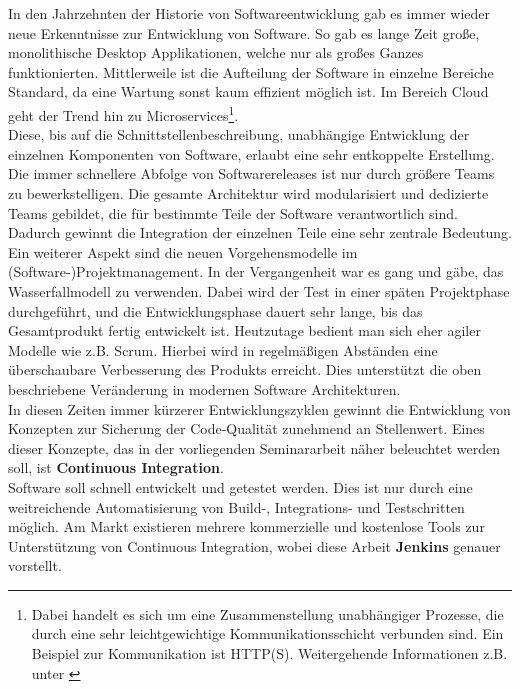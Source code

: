 In den Jahrzehnten der Historie von Softwareentwicklung gab es immer wieder neue Erkenntnisse zur Entwicklung von Software. So gab es lange Zeit große, monolithische Desktop Applikationen, welche nur als großes Ganzes funktionierten. Mittlerweile ist die Aufteilung der Software in einzelne Bereiche Standard, da eine Wartung sonst kaum effizient möglich ist. Im Bereich Cloud geht der Trend hin zu Microservices\footnote{Dabei handelt es sich um eine Zusammenstellung unabhängiger Prozesse, die durch eine sehr leichtgewichtige Kommunikationsschicht verbunden sind. Ein Beispiel zur Kommunikation ist HTTP(S). Weitergehende Informationen z.B. unter \cite{fowler-Microservice}}.\\
Diese, bis auf die Schnittstellenbeschreibung, unabhängige Entwicklung der einzelnen Komponenten von Software, erlaubt eine sehr entkoppelte Erstellung. Die immer schnellere Abfolge von Softwarereleases ist nur durch größere Teams zu bewerkstelligen. Die gesamte Architektur wird modularisiert und dedizierte Teams gebildet, die für bestimmte Teile der Software verantwortlich sind. Dadurch gewinnt die Integration der einzelnen Teile eine sehr zentrale Bedeutung.\\
Ein weiterer Aspekt sind die neuen Vorgehensmodelle im (Software-)Projektmanagement. In der Vergangenheit war es gang und gäbe, das Wasserfallmodell zu verwenden. Dabei wird der Test in einer späten Projektphase durchgeführt, und  die Entwicklungsphase dauert sehr lange, bis das Gesamtprodukt fertig entwickelt ist. Heutzutage bedient man sich eher agiler Modelle wie z.B. Scrum. Hierbei wird in regelmäßigen Abständen eine überschaubare Verbesserung des Produkts erreicht. Dies unterstützt die oben beschriebene Veränderung in modernen Software Architekturen. \\
In diesen Zeiten immer kürzerer Entwicklungszyklen gewinnt die Entwicklung von Konzepten zur Sicherung der Code-Qualität zunehmend an Stellenwert. Eines dieser Konzepte, das in der vorliegenden Seminararbeit näher beleuchtet werden soll, ist \textbf{Continuous Integration}.\\
 Software soll schnell entwickelt und getestet werden. Dies ist nur durch eine weitreichende  Automatisierung von Build-, Integrations- und Testschritten möglich. Am Markt existieren mehrere kommerzielle und kostenlose Tools zur Unterstützung von Continuous Integration, wobei diese Arbeit \textbf{Jenkins} genauer vorstellt.
